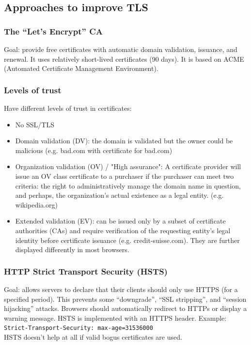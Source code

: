 \documentclass[11pt,oneside,a4paper]{article}
\begin{document}
\subsection{Approaches to improve TLS}

\subsubsection{The “Let’s Encrypt” CA}

Goal: provide free certificates with automatic domain validation, issuance, and renewal. It uses relatively short-lived certificates (90 days). It is based on ACME (Automated Certificate Management Environment).

\subsubsection{Levels of trust}

Have different levels of trust in certificates:

\vspace{-\topsep}
\begin{itemize}
	\setlength{\itemsep}{0pt}
	\setlength{\parskip}{0pt}
	\item No SSL/TLS
	\item Domain validation (DV): the domain is validated but the owner could be malicious (e.g. bad.com with certificate for bad.com)
	\item Organization validation (OV) / "High assurance": A certificate provider will issue an OV class certificate to a purchaser if the purchaser can meet two criteria: the right to administratively manage the domain name in question, and perhaps, the organization's actual existence as a legal entity. (e.g. wikipedia.org)
	\item Extended validation (EV): can be issued only by a subset of certificate authorities (CAs) and require verification of the requesting entity's legal identity before certificate issuance (e.g. credit-suisse.com). They are further displayed differently in most browsers. 
\end{itemize}
\vspace{-\topsep}

\subsubsection{HTTP Strict Transport Security (HSTS)}

Goal: allows servers to declare that their clients should only use HTTPS (for a specified period). This prevents some “downgrade”, “SSL stripping”, and “session hijacking” attacks. Browsers should automatically redirect to HTTPs or display a warning message. HSTS is implemented with an HTTPS header. Example: \texttt{Strict-Transport-Security: max-age=31536000}\\
HSTS doesn't help at all if valid bogus certificates are used.
\end{document}
